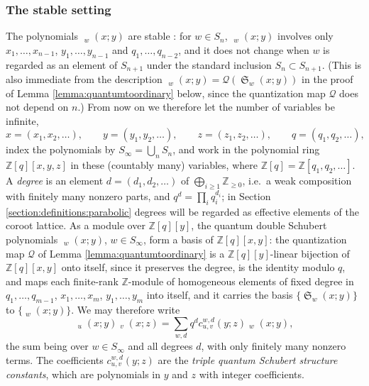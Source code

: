 \documentclass{amsart}
\theoremstyle{definition}
\theoremstyle{remark}
\numberwithin{equation}{section}
\DeclareMathOperator{\sch}{\mathfrak{S}}
\DeclareMathOperator{\qsch}{\widetilde{\mathfrak{S}}}
\begin{document}
\subsubsection*{The stable setting}
The polynomials $\qsch_w(x;y)$ are stable \cite{kirillov2000quantum}: for $w\in S_n$, $\qsch_w(x;y)$ involves only $x_1,\ldots,x_{n-1}$, $y_1,\ldots,y_{n-1}$ and $q_1,\ldots,q_{n-2}$, and it does not change when $w$ is regarded as an element of $S_{n+1}$ under the standard inclusion $S_n\subset S_{n+1}$. (This is also immediate from the description $\qsch_w(x;y)=\mathcal Q(\sch_w(x;y))$ in the proof of Lemma \ref{lemma:quantumtoordinary} below, since the quantization map $\mathcal Q$ does not depend on $n$.) From now on we therefore let the number of variables be infinite,
$$x=(x_1,x_2,\ldots),\qquad y=(y_1,y_2,\ldots),\qquad z=(z_1,z_2,\ldots),\qquad q=(q_1,q_2,\ldots),$$
index the polynomials by $S_\infty=\bigcup_nS_n$, and work in the polynomial ring $\mathbb Z[q][x,y,z]$ in these (countably many) variables, where $\mathbb Z[q]=\mathbb Z[q_1,q_2,\ldots]$. A \emph{degree} is an element $d=(d_1,d_2,\ldots)$ of $\bigoplus_{i\geq1}\mathbb Z_{\geq0}$, i.e.\ a weak composition with finitely many nonzero parts, and $q^d=\prod_iq_i^{d_i}$; in Section \ref{section:definitions:parabolic} degrees will be regarded as effective elements of the coroot lattice. As a module over $\mathbb{Z}[q][y]$, the quantum double Schubert polynomials $\qsch_w(x;y)$, $w\in S_\infty$, form a basis of $\mathbb{Z}[q][x,y]$: the quantization map $\mathcal Q$ of Lemma \ref{lemma:quantumtoordinary} is a $\mathbb Z[q][y]$-linear bijection of $\mathbb Z[q][x,y]$ onto itself, since it preserves the degree, is the identity modulo $q$, and maps each finite-rank $\mathbb Z$-module of homogeneous elements of fixed degree in $q_1,\ldots,q_{m-1}$, $x_1,\ldots,x_m$, $y_1,\ldots,y_m$ into itself, and it carries the basis $\{\sch_w(x;y)\}$ to $\{\qsch_w(x;y)\}$. We may therefore write
$$\qsch_u(x;y)\qsch_v(x;z)=\sum_{w,d}q^dc_{u,v}^{w,d}(y;z)\qsch_w(x;y),$$
the sum being over $w\in S_\infty$ and all degrees $d$, with only finitely many nonzero terms. The coefficients $c_{u,v}^{w,d}(y;z)$ are the \emph{triple quantum Schubert structure constants}, which are polynomials in $y$ and $z$ with integer coefficients.
\end{document}
